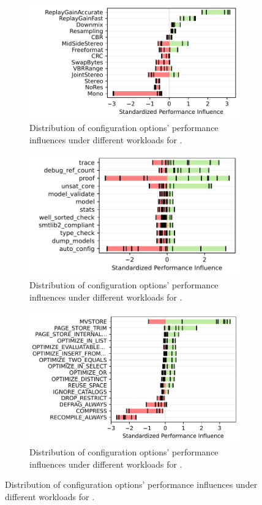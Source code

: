 {{{{\begin{figure}[ht!]
	\centering
	\begin{subfigure}{\linewidth}
		\hfill\includegraphics[width=0.98\linewidth]{images/jump3r.pdf}
		\caption{Distribution of configuration options' performance influences under different workloads for \jumper.}
		\label{fig:overview_jump3r}
	\end{subfigure}
	\begin{subfigure}{\linewidth}
		\hfill%
		\includegraphics[width=0.92\linewidth]{images/z3.pdf}
		\vfill
		\caption{Distribution of configuration options' performance influences under different workloads for \zdrei.}
		\label{fig:overview_z3}
	\end{subfigure}
	\begin{subfigure}{\linewidth}
		\hfill\includegraphics[width=1.0\linewidth]{images/h2.pdf}
		\caption{Distribution of configuration options' performance influences under different workloads for \htwo.}
		\label{fig:overview_h2}
	\end{subfigure}
	

\end{figure}}}}}
